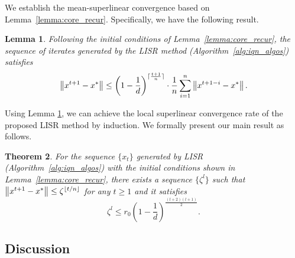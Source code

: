 \documentclass[letterpaper]{article} %
\theoremstyle{plain}
\newtheorem{theorem}{Theorem}[section]
\newtheorem{lemma}[theorem]{Lemma}
\theoremstyle{definition}
\theoremstyle{remark}
\DeclarePairedDelimiter\ceil{\lceil}{\rceil}
\DeclarePairedDelimiter\floor{\lfloor}{\rfloor}
\newcommand\norm[1]{\left\lVert#1\right\rVert}
\begin{document}
We establish the mean-superlinear convergence based on Lemma~\ref{lemma:core_recur}. Specifically, we have the following result.
\begin{lemma}
    Following the initial conditions of Lemma~\ref{lemma:core_recur},
    the sequence of iterates generated by the LISR method (Algorithm~\ref{alg:iqn_algos}) satisfies
    \begin{equation*}
        \norm{x^{t+1} - x^*} \leq \left(1 - \frac{1}{d}\right)^{\ceil{\frac{t+1}{n}}}\cdot\frac{1}{n}\sum_{i=1}^n \norm{x^{t+1-i} - x^*}.
    \end{equation*}
        \label{lemma:sr1_avg}
\end{lemma}


Using Lemma \ref{lemma:sr1_avg}, we can achieve the local superlinear convergence rate of the proposed LISR method by induction.
We formally present our main result as follows.
\begin{theorem}
    For the sequence $\{x_t\}$ generated by LISR  (Algorithm~\ref{alg:iqn_algos}) with the initial conditions shown in  Lemma~\ref{lemma:core_recur}, there exists a sequence $\{\zeta^l\}$ such that $\norm{x^{t+1} - x^*} \leq \zeta^{\floor{{t}/{n}}}$ for any $t\geq 1$ and it satisfies
    \begin{equation}
        \zeta^l \leq r_0 \left(1 - \frac{1}{d}\right)^{\frac{(l+2)(l+1)}{2}}.
        \label{main_result_eq}
    \end{equation}
    \label{thm:glins_res}
\end{theorem}

\subsection{Discussion}
\end{document}
